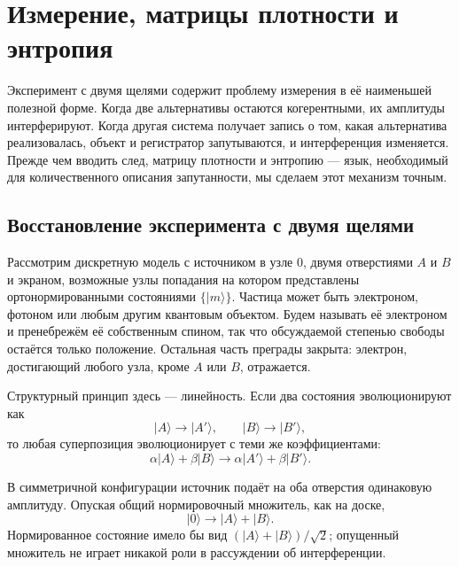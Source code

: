 \chapter{Измерение, матрицы плотности и энтропия}

Эксперимент с двумя щелями содержит проблему измерения в её наименьшей полезной форме. Когда две альтернативы остаются когерентными, их амплитуды интерферируют. Когда другая система получает запись о том, какая альтернатива реализовалась, объект и регистратор запутываются, и интерференция изменяется. Прежде чем вводить след, матрицу плотности и энтропию --- язык, необходимый для количественного описания запутанности, мы сделаем этот механизм точным.

\section{Восстановление эксперимента с двумя щелями}

Рассмотрим дискретную модель с источником в узле \(0\), двумя отверстиями \(A\) и \(B\) и экраном, возможные узлы попадания на котором представлены ортонормированными состояниями \(\{|m\rangle\}\). Частица может быть электроном, фотоном или любым другим квантовым объектом. Будем называть её электроном и пренебрежём её собственным спином, так что обсуждаемой степенью свободы остаётся только положение. Остальная часть преграды закрыта: электрон, достигающий любого узла, кроме \(A\) или \(B\), отражается.

Структурный принцип здесь — линейность. Если два состояния эволюционируют как
\begin{equation}
|A\rangle\longrightarrow |A'\rangle,
\qquad
|B\rangle\longrightarrow |B'\rangle,
\end{equation}
то любая суперпозиция эволюционирует с теми же коэффициентами:
\begin{equation}
\alpha|A\rangle+\beta|B\rangle
\longrightarrow
\alpha|A'\rangle+\beta|B'\rangle.
\end{equation}

В симметричной конфигурации источник подаёт на оба отверстия одинаковую амплитуду. Опуская общий нормировочный множитель, как на доске,
\begin{equation}
|0\rangle\longrightarrow |A\rangle+|B\rangle.
\end{equation}
Нормированное состояние имело бы вид \((|A\rangle+|B\rangle)/\sqrt{2}\); опущенный множитель не играет никакой роли в рассуждении об интерференции.


